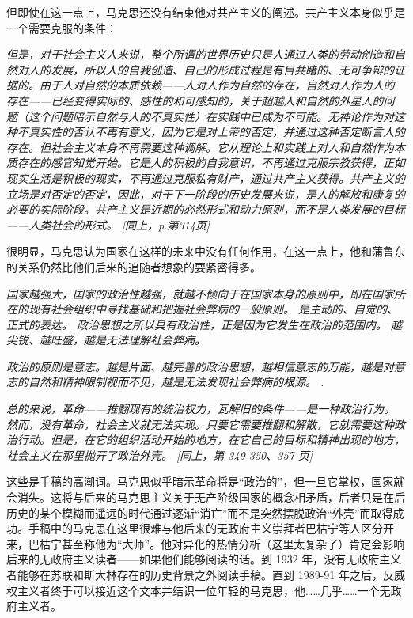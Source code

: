 \documentclass[DIV=12,%
               BCOR=0mm,%
               headinclude=false,%
               footinclude=false,open=any,%
               fontsize=10pt,%
               oneside,%
               paper=210mm:11in]%
               {scrbook}
\begin{document}
但即使在这一点上，马克思还没有结束他对共产主义的阐述。共产主义本身似乎是一个需要克服的条件：


\emph{但是，对于社会主义人来说，整个所谓的世界历史只是人通过人类的劳动创造和自然对人的发展，所以人的自我创造、自己的形成过程是有目共睹的、无可争辩的证据的。由于人对自然的本质依赖——人对人作为自然的存在，自然对人作为人的存在——已经变得实际的、感性的和可感知的，关于超越人和自然的外星人的问题（这个问题暗示自然与人的不真实性）在实践中已成为不可能。无神论作为对这种不真实性的否认不再有意义，因为它是对上帝的否定，并通过这种否定断言人的存在。但社会主义本身不再需要这种调解。它从理论上和实践上对人和自然作为本质存在的感官知觉开始。它是人的积极的自我意识，不再通过克服宗教获得，正如现实生活是积极的现实，不再通过克服私有财产，通过共产主义获得。共产主义的立场是对否定的否定，因此，对于下一阶段的历史发展来说，是人的解放和康复的必要的实际阶段。共产主义是近期的必然形式和动力原则，而不是人类发展的目标——人类社会的形式。 [同上，p.第314页]}


很明显，马克思认为国家在这样的未来中没有任何作用，在这一点上，他和蒲鲁东的关系仍然比他们后来的追随者想象的要紧密得多。


\emph{国家越强大，国家的政治性越强，就越不倾向于在国家本身的原则中，即在国家所在的现有社会组织中寻找基础和把握社会弊病的一般原则。 是主动的、自觉的、正式的表达。 政治思想之所以具有政治性，正是因为它发生在政治的范围内。 越尖锐、越旺盛，越是无法理解社会弊病。}


\emph{政治的原则是意志。越是片面、越完善的政治思想，越相信意志的万能，越是对意志的自然和精神限制视而不见，越是无法发现社会弊病的根源。 .}


\emph{总的来说，革命——推翻现有的统治权力，瓦解旧的条件——是一种政治行为。然而，没有革命，社会主义就无法实现。只要它需要推翻和解散，它就需要这种政治行动。但是，在它的组织活动开始的地方，在它自己的目标和精神出现的地方，社会主义在那里抛开了政治外壳。 [同上，第 349-350、357 页]}


这些是手稿的高潮词。马克思似乎暗示革命将是“政治的”，但一旦它掌权，国家就会消失。这将与后来的马克思主义关于无产阶级国家的概念相矛盾，后者只是在后历史的某个模糊而遥远的时代通过逐渐“消亡”而不是突然摆脱政治“外壳”而取得成功。手稿中的马克思在这里很难与他后来的无政府主义崇拜者巴枯宁等人区分开来，巴枯宁甚至称他为“大师”。他对异化的热情分析（这里太复杂了）肯定会影响后来的无政府主义读者——如果他们能够阅读的话。到 1932 年，没有无政府主义者能够在苏联和斯大林存在的历史背景之外阅读手稿。直到 1989-91 年之后，反威权主义者终于可以接近这个文本并结识一位年轻的马克思，他\dots{}\dots{}几乎\dots{}\dots{}一个无政府主义者。
\end{document}
